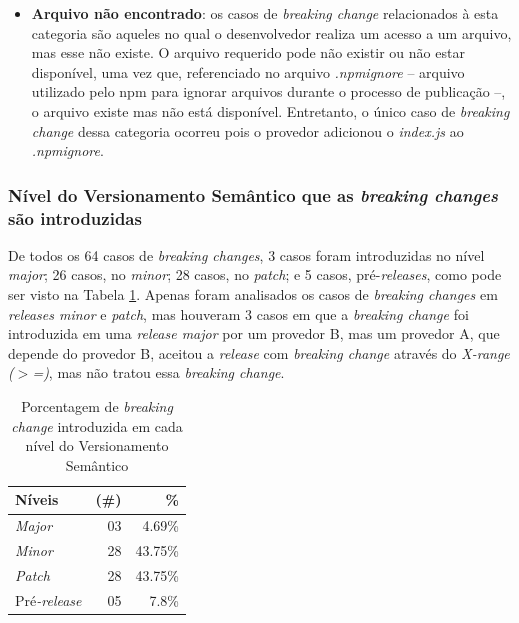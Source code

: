 \begin{itemize}
    \item \textbf{Arquivo não encontrado}: os casos de \textit{breaking change} relacionados à esta categoria são aqueles no qual o desenvolvedor realiza um acesso a um arquivo, mas esse não existe. O arquivo requerido pode não existir ou não estar disponível, uma vez que, referenciado no arquivo \textit{.npmignore} -- arquivo utilizado pelo \textsf{npm} para ignorar arquivos durante o processo de publicação --, o arquivo existe mas não está disponível. Entretanto, o único caso de \textit{breaking change} dessa categoria ocorreu pois o provedor adicionou o \textit{index.js} ao \textit{.npmignore}.
\end{itemize}{}

\subsubsection{Nível do Versionamento Semântico que as \textit{breaking changes} são introduzidas}

De todos os 64 casos de \textit{breaking changes}, 3 casos foram introduzidas no nível \textit{major}; 26 casos, no \textit{minor}; 28 casos, no \textit{patch}; e 5 casos, pré-\textit{releases}, como pode ser visto na Tabela \ref{tab:semver_levels}. Apenas foram analisados os casos de \textit{breaking changes} em \textit{releases minor} e \textit{patch}, mas houveram 3 casos em que a \textit{breaking change} foi introduzida em uma \textit{release major} por um provedor \textsf{B}, mas um provedor \textsf{A}, que depende do provedor \textsf{B}, aceitou a \textit{release} com \textit{breaking change} através do \textit{X-range ($>$=)}, mas não tratou essa \textit{breaking change}.

\begin{table}
	\centering
	\caption{Porcentagem de \textit{breaking change} introduzida em cada nível do Versionamento Semântico}
	\begin{tabular}{lrr}
		\toprule
		\textbf{Níveis} & (\#) & \textbf{\%} \\ \hline
		\textit{Major}           & 03   & 4.69\%      \\
		\textit{Minor}           & 28   & 43.75\%     \\
		\textit{Patch}           & 28   & 43.75\%     \\
		Pré\textit{-release}     & 05   & 7.8\%       \\ \bottomrule
	\end{tabular}
	\label{tab:semver_levels}
\end{table}


